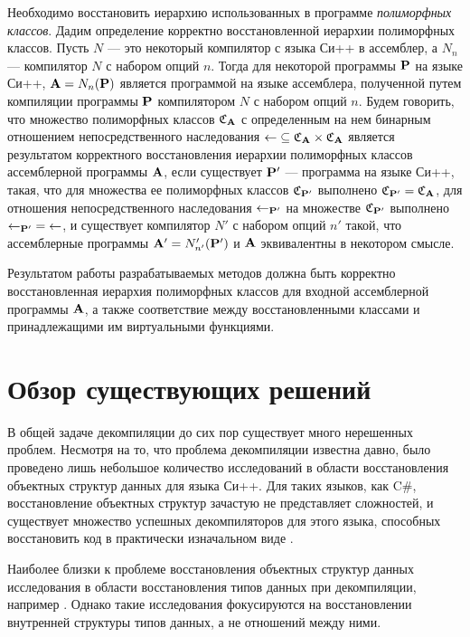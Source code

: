 Необходимо восстановить иерархию использованных в программе {\it полиморфных классов}. Дадим определение корректно восстановленной иерархии полиморфных классов. Пусть $N$ --- это некоторый компилятор с языка Си++ в ассемблер, а $N_n$ --- компилятор $N$ с набором опций $n$. Тогда для некоторой программы $\mathbf{P}$ на языке Си++, $\mathbf{A} = N_n(\mathbf{P})$ является программой на языке ассемблера, полученной путем компиляции программы $\mathbf{P}$ компилятором $N$ с набором опций $n$. Будем говорить, что множество полиморфных классов $\mathfrak{C}_{\mathbf{A}}$ с определенным на нем бинарным отношением непосредственного наследования $\leftarrow \; \subseteq \mathfrak{C}_{\mathbf{A}} \times \mathfrak{C}_{\mathbf{A}}$ является результатом корректного восстановления иерархии полиморфных классов ассемблерной программы $\mathbf{A}$, если существует $\mathbf{P}'$ --- программа на языке Си++, такая, что для множества ее полиморфных классов $\mathfrak{C}_{\mathbf{P}'}$ выполнено $\mathfrak{C}_{\mathbf{P}'} = \mathfrak{C}_{\mathbf{A}}$, для отношения непосредственного наследования $\leftarrow_{\mathbf{P}'}$ на множестве $\mathfrak{C}_{\mathbf{P}'}$ выполнено $\leftarrow_{\mathbf{P}'} \; = \; \leftarrow$, и существует компилятор $N'$ с набором опций $n'$ такой, что ассемблерные программы $\mathbf{A}' = N'_{n'}(\mathbf{P}')$ и $\mathbf{A}$ эквивалентны в некотором смысле.

Результатом работы разрабатываемых методов должна быть корректно восстановленная иерархия полиморфных классов для входной ассемблерной программы $\mathbf{A}$, а также соответствие между восстановленными классами и принадлежащими им виртуальными функциями.




\newpage
\section{Обзор существующих решений}
В общей задаче декомпиляции до сих пор существует много нерешенных проблем. Несмотря на то, что проблема декомпиляции известна давно, было проведено лишь небольшое количество исследований в области восстановления объектных структур данных для языка Си++. Для таких языков, как C\#, восстановление объектных структур зачастую не представляет сложностей, и существует множество успешных декомпиляторов для этого языка, способных восстановить код в практически изначальном виде \cite{wiener05}.

Наиболее близки к проблеме восстановления объектных структур данных исследования в области восстановления типов данных при декомпиляции, например \cite{mycroft99}. Однако такие исследования фокусируются на восстановлении внутренней структуры типов данных, а не отношений между ними.

